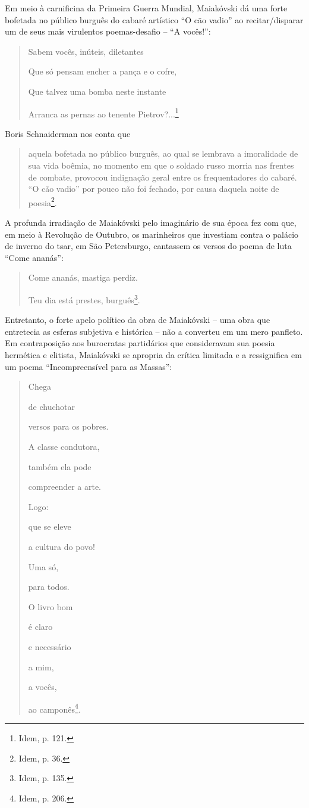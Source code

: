 Em meio à carnificina da Primeira Guerra Mundial, Maiakóvski dá uma
forte bofetada no público burguês do cabaré artístico ``O cão vadio'' ao
recitar/disparar um de seus mais virulentos poemas-desafio -- ``A
vocês!'':

\begin{quote}
Sabem vocês, inúteis, diletantes

Que só pensam encher a pança e o cofre,

Que talvez uma bomba neste instante

Arranca as pernas ao tenente Pietrov?...\footnote{Idem, p. 121.}
\end{quote}

Boris Schnaiderman nos conta que

\begin{quote}
aquela bofetada no público burguês, ao qual se lembrava a imoralidade de
sua vida boêmia, no momento em que o soldado russo morria nas frentes de
combate, provocou indignação geral entre os frequentadores do cabaré.
``O cão vadio'' por pouco não foi fechado, por causa daquela noite de
poesia\footnote{Idem, p. 36.}.
\end{quote}

A profunda irradiação de Maiakóvski pelo imaginário de sua época fez com
que, em meio à Revolução de Outubro, os marinheiros que investiam contra
o palácio de inverno do tsar, em São Petersburgo, cantassem os versos do
poema de luta ``Come ananás'':

\begin{quote}
Come ananás, mastiga perdiz.

Teu dia está prestes, burguês\footnote{Idem, p. 135.}.
\end{quote}

Entretanto, o forte apelo político da obra de Maiakóvski -- uma obra que
entretecia as esferas subjetiva e histórica -- não a converteu em um
mero panfleto. Em contraposição aos burocratas partidários que
consideravam sua poesia hermética e elitista, Maiakóvski se apropria da
crítica limitada e a ressignifica em um poema ``Incompreensível para as
Massas'':

\begin{quote}
Chega

de chuchotar

versos para os pobres.

A classe condutora,

também ela pode

compreender a arte.

Logo:

que se eleve

a cultura do povo!

Uma só,

para todos.

O livro bom

é claro

e necessário

a mim,

a vocês,

ao camponês\footnote{Idem, p. 206.}.
\end{quote}

